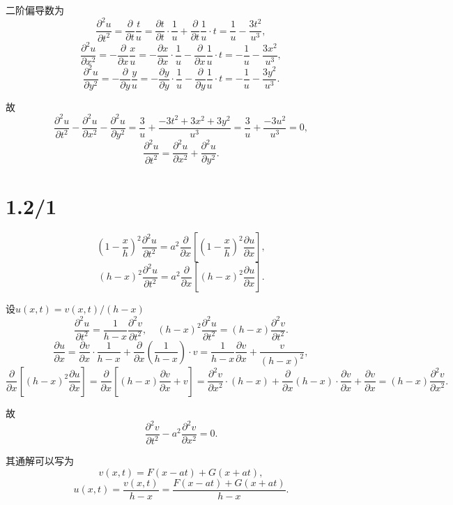 \documentclass[11pt,a4paper]{article}
\begin{document}
二阶偏导数为
$$\frac{\partial^2 u}{\partial t^2}=\frac{\partial}{\partial t}\frac{t}{u}=\frac{\partial t}{\partial t}\cdot \frac{1}{u}+\frac{\partial}{\partial t}\frac{1}{u}\cdot t=\frac{1}{u}-\frac{3t^2}{u^3},$$
$$\frac{\partial^2 u}{\partial x^2}=-\frac{\partial}{\partial x}\frac{x}{u}=-\frac{\partial x}{\partial x}\cdot \frac{1}{u}-\frac{\partial}{\partial x}\frac{1}{u}\cdot t=-\frac{1}{u}-\frac{3x^2}{u^3},$$
$$\frac{\partial^2 u}{\partial y^2}=-\frac{\partial}{\partial y}\frac{y}{u}=-\frac{\partial y}{\partial y}\cdot \frac{1}{u}-\frac{\partial}{\partial y}\frac{1}{u}\cdot t=-\frac{1}{u}-\frac{3y^2}{u^3}.$$

故
$$\frac{\partial^2 u}{\partial t^2}-\frac{\partial^2 u}{\partial x^2}-\frac{\partial^2 u}{\partial y^2}=\frac{3}{u}+\frac{-3t^2+3x^2+3y^2}{u^3}=\frac{3}{u}+\frac{-3u^2}{u^3}=0,$$
$$\frac{\partial^2 u}{\partial t^2}=\frac{\partial^2 u}{\partial x^2}+\frac{\partial^2 u}{\partial y^2}.$$

\section{1.2/1}



$$\left(1-\frac{x}{h}\right)^2\frac{\partial^2 u}{\partial t^2}=a^2\frac{\partial}{\partial x}\left[\left(1-\frac{x}{h}\right)^2\frac{\partial u}{\partial x}\right],$$
$$(h-x)^2\frac{\partial^2 u}{\partial t^2}=a^2\frac{\partial}{\partial x}\left[(h-x)^2\frac{\partial u}{\partial x}\right].$$

设$u(x,t)=v(x,t)/(h-x)$
$$\frac{\partial^2 u}{\partial t^2}=\frac{1}{h-x}\frac{\partial^2 v}{\partial t^2},\quad (h-x)^2\frac{\partial^2 u}{\partial t^2}=(h-x)\frac{\partial^2 v}{\partial t^2}.$$
$$\frac{\partial u}{\partial x}=\frac{\partial v}{\partial x}\cdot\frac{1}{h-x}+\frac{\partial}{\partial x}\left(\frac{1}{h-x}\right)\cdot v=\frac{1}{h-x}\frac{\partial v}{\partial x}+\frac{v}{(h-x)^2},$$
$$\frac{\partial}{\partial x}\left[(h-x)^2\frac{\partial u}{\partial x}\right]=\frac{\partial}{\partial x}\left[(h-x)\frac{\partial v}{\partial x}+v\right]=
\frac{\partial^2 v}{\partial x^2}\cdot(h-x)+\frac{\partial}{\partial x}(h-x)\cdot\frac{\partial v}{\partial x}+\frac{\partial v}{\partial x}=(h-x)\frac{\partial^2 v}{\partial x^2}.$$

故
$$\frac{\partial^2 v}{\partial t^2}-a^2\frac{\partial^2 v}{\partial x^2}=0.$$

其通解可以写为
$$v(x,t)=F(x-at)+G(x+at),$$
$$u(x,t)=\frac{v(x,t)}{h-x}=\frac{F(x-at)+G(x+at)}{h-x}.$$
\end{document}
